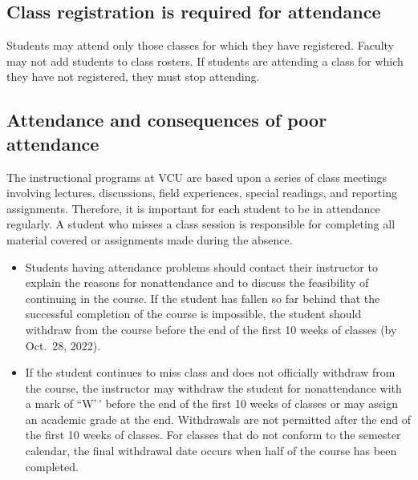 \documentclass[
  letterpaper,
]{book}
\begin{document}

\subsection*{Class registration is required for
attendance}\label{class-registration-is-required-for-attendance}

Students may attend only those classes for which they have registered.
Faculty may not add students to class rosters. If students are attending
a class for which they have not registered, they must stop attending.

\subsection*{Attendance and consequences of poor
attendance}\label{attendance-and-consequences-of-poor-attendance}

The instructional programs at VCU are based upon a series of class
meetings involving lectures, discussions, field experiences, special
readings, and reporting assignments. Therefore, it is important for each
student to be in attendance regularly. A student who misses a class
session is responsible for completing all material covered or
assignments made during the absence.

\begin{itemize}
\item
  Students having attendance problems should contact their instructor to
  explain the reasons for nonattendance and to discuss the feasibility
  of continuing in the course. If the student has fallen so far behind
  that the successful completion of the course is impossible, the
  student should withdraw from the course before the end of the first 10
  weeks of classes (by Oct.~28, 2022).
\item
  If the student continues to miss class and does not officially
  withdraw from the course, the instructor may withdraw the student for
  nonattendance with a mark of ``W'\,' before the end of the first 10
  weeks of classes or may assign an academic grade at the end.
  Withdrawals are not permitted after the end of the first 10 weeks of
  classes. For classes that do not conform to the semester calendar, the
  final withdrawal date occurs when half of the course has been
  completed.
\end{itemize}
\end{document}
